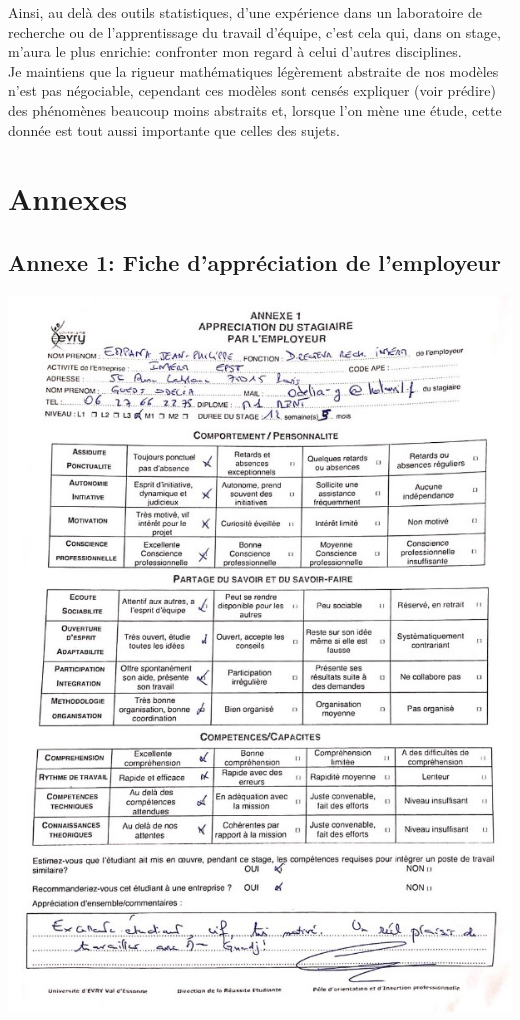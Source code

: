 \documentclass{book}
\begin{document}
\bigskip
\noindent
Ainsi, au delà des outils statistiques, d'une expérience dans un laboratoire de recherche ou de l'apprentissage du travail d'équipe, c'est cela qui, dans on stage, m'aura le plus enrichie: confronter mon regard à celui d'autres disciplines.\\

\bigskip
\noindent
Je maintiens que la rigueur mathématiques légèrement abstraite de nos modèles n'est pas négociable, cependant ces modèles sont censés expliquer (voir prédire) des phénomènes beaucoup moins abstraits et, lorsque l'on mène une étude, cette donnée est tout aussi importante que celles des sujets.\\


\backmatter
\section{Annexes}


\subsection{Annexe 1: Fiche d'appréciation de l'employeur}
\includegraphics[scale=1.5]{appreciation_JPE.jpg}
\end{document}
